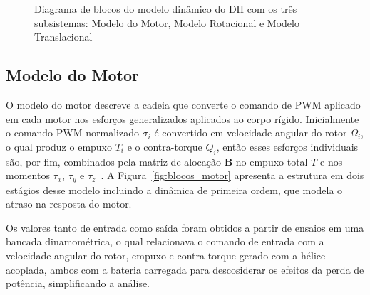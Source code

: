 \documentclass{ieeeaccess}
\begin{document}
\begin{figure}[!t]
{%
}
\caption{Diagrama de blocos do modelo dinâmico do DH com os três subsistemas: Modelo do Motor, Modelo Rotacional e Modelo Translacional}
\label{fig:model_diagram}
\end{figure}

\subsection{Modelo do Motor}

O modelo do motor descreve a cadeia que converte o comando de PWM aplicado em cada motor nos esforços generalizados aplicados ao corpo rígido. Inicialmente o comando PWM normalizado $\sigma_i$ é convertido em velocidade angular do rotor $\Omega_i$, o qual produz o empuxo $T_i$ e o contra-torque $Q_i$, então esses esforços individuais são, por fim, combinados pela matriz de alocação $\mathbf{B}$ no empuxo total $T$ e nos momentos $\tau_x$, $\tau_y$ e $\tau_z$~\cite{c13}. A Figura~\ref{fig:blocos_motor} apresenta a estrutura em dois estágios desse modelo incluindo a dinâmica de primeira ordem, que modela o atraso na resposta do motor. 

Os valores tanto de entrada como saída foram obtidos a partir de ensaios em uma bancada dinamométrica, o qual relacionava o comando de entrada com a velocidade angular do rotor, empuxo e contra-torque gerado com a hélice acoplada, ambos com a bateria carregada para descosiderar os efeitos da perda de potência, simplificando a análise.
\end{document}
